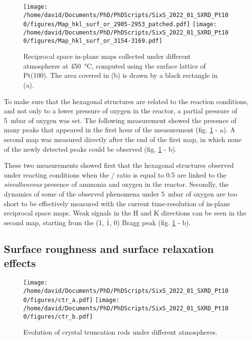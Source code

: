 \begin{figure}[!htb]
    \centering
    \texttt{[image: /home/david/Documents/PhD/PhDScripts/SixS\_2022\_01\_SXRD\_Pt100/figures/Map\_hkl\_surf\_or\_2905-2953\_patched.pdf]}
    \texttt{[image: /home/david/Documents/PhD/PhDScripts/SixS\_2022\_01\_SXRD\_Pt100/figures/Map\_hkl\_surf\_or\_3154-3169.pdf]}
    \caption{
        Reciprocal space in-plane maps collected under different atmospheres at \qty{450}{\degreeCelsius}, computed using the surface lattice of Pt(100).
        The area covered in (b) is drawn by a black rectangle in (a).
    }
    \label{fig:MapsPt100D}
\end{figure}

To make sure that the hexagonal structures are related to the reaction conditions, and not only to a lower pressure of oxygen in the reactor, a partial pressure of \qty{5}{\milli\bar} of oxygen was set.
The following measurement showed the presence of many peaks that appeared in the first hour of the measurement (fig. \ref{fig:MapsPt100D} - a).
A second map was measured directly after the end of the first map, in which none of the newly detected peaks could be observed (fig. \ref{fig:MapsPt100D} - b).

These two measurements showed first that the hexagonal structures observed under reacting conditions when the / ratio is equal to \num{0.5} are linked to the \textit{simultaneous} presence of ammonia and oxygen in the reactor.
Secondly, the dynamics of some of the observed phenomena under \qty{5}{\milli\bar} of oxygen are too short to be effectively measured with the current time-resolution of in-plane reciprocal space maps.
Weak signals in the H and K directions can be seen in the second map, starting from the (1, $\bar{1}$, 0) Bragg peak (fig. \ref{fig:MapsPt100D} - b).

\subsection{Surface roughness and surface relaxation effects}

\begin{figure}[!htb]
    \centering
    \texttt{[image: /home/david/Documents/PhD/PhDScripts/SixS\_2022\_01\_SXRD\_Pt100/figures/ctr\_a.pdf]}
    \texttt{[image: /home/david/Documents/PhD/PhDScripts/SixS\_2022\_01\_SXRD\_Pt100/figures/ctr\_b.pdf]}
    \caption{
        Evolution of crystal truncation rods under different atmospheres.
    }
    \label{fig:CTRPt100}
\end{figure}

